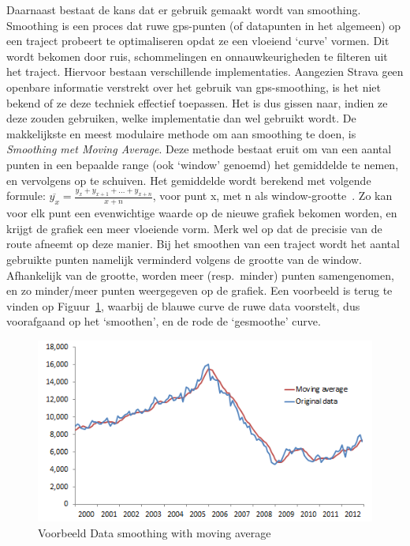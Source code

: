 Daarnaast bestaat de kans dat er gebruik gemaakt wordt van smoothing. Smoothing
is een proces dat ruwe \ac{gps}-punten (of datapunten in het algemeen) op een
traject probeert te optimaliseren opdat ze een vloeiend `curve' vormen. Dit
wordt bekomen door ruis, schommelingen en onnauwkeurigheden te filteren uit het
traject. Hiervoor bestaan verschillende implementaties. Aangezien Strava geen
openbare informatie verstrekt over het gebruik van gps-smoothing, is het niet
bekend of ze deze techniek effectief toepassen. Het is dus gissen naar, indien
ze deze zouden gebruiken, welke implementatie dan wel gebruikt wordt. De
makkelijkste en meest modulaire methode om aan smoothing te doen, is
\textit{Smoothing met Moving Average}. Deze methode bestaat eruit om van een
aantal punten in een bepaalde range (ook `window' genoemd) het gemiddelde te
nemen, en vervolgens op te schuiven. Het gemiddelde wordt berekend met volgende
formule: $\overline{y_x} = \frac{y_x + y_{x+1} + \ldots + y_{x+n}}{x+n}$, voor
punt x, met n als window-grootte~\cite{Smoothin16:online,
    SmoothingandInterpolatingNoisyGPSDatawithSmoothingSplines, Smoothin86:online}.
Zo kan voor elk punt een evenwichtige waarde op de nieuwe grafiek bekomen
worden, en krijgt de grafiek een meer vloeiende vorm. Merk wel op dat de
precisie van de route afneemt op deze manier. Bij het smoothen van een traject
wordt het aantal gebruikte punten namelijk verminderd volgens de grootte van de
window. Afhankelijk van de grootte, worden meer (resp.\ minder) punten
samengenomen, en zo minder/meer punten weergegeven op de grafiek. Een voorbeeld
is terug te vinden op Figuur~\ref{fig:SmoothingExample}, waarbij de blauwe
curve de ruwe data voorstelt, dus voorafgaand op het `smoothen', en de rode de
`gesmoothe' curve.
\begin{figure}[h]
    \centering
    \includegraphics[width=0.6\linewidth]{fig/SmoothingExample.png}
    \caption{Voorbeeld Data smoothing with moving average}\label{fig:SmoothingExample}
\end{figure}

